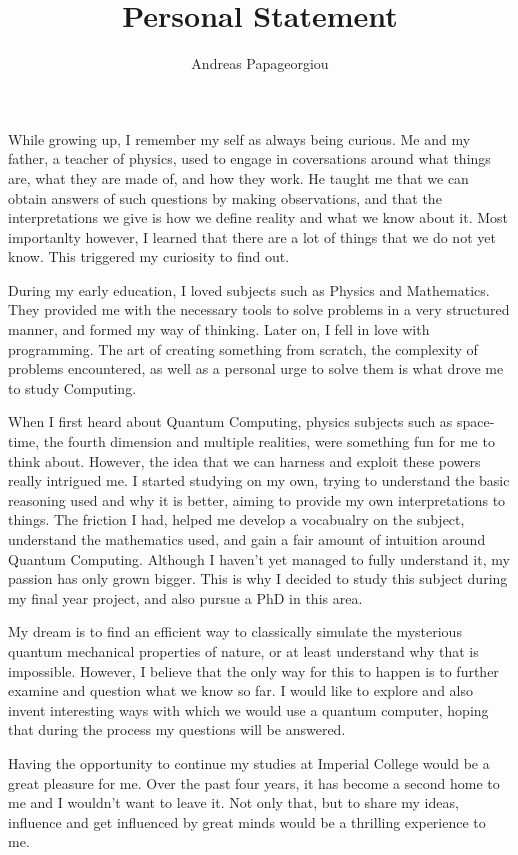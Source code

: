 \documentclass[a4paper,10pt]{article}
\title{Personal Statement}
\author{Andreas Papageorgiou}
\date{}
\begin{document}
\maketitle
\thispagestyle{empty}

\onehalfspacing

While growing up, I remember my self as always being curious. Me and my father, a teacher of physics, used to engage in coversations around
what things are, what they are made of, and how they work. He taught me that we can obtain answers of such
questions by making observations, and that the interpretations we give is how we define reality and what we know about it.
Most importanlty however, I learned that there are a lot of things that we do not yet know. This triggered my curiosity to find out.

During my early education, I loved subjects such as Physics and Mathematics. They provided me with the necessary tools
to solve problems in a very structured manner, and formed my way of thinking. Later on, I fell in love with programming.
The art of creating something from scratch, the complexity of problems encountered, as well as a personal urge to solve them
is what drove me to study Computing.

When I first heard about Quantum Computing, physics subjects such as space-time, the fourth dimension and multiple realities, were 
something fun for me to think about. However, the idea that we can harness and exploit these powers really intrigued me.
I started studying on my own, trying to understand the basic reasoning used and why it is better, aiming to provide my own
interpretations to things. The friction I had, helped me develop a vocabualry on the subject, understand the mathematics used,
and gain a fair amount of intuition around Quantum Computing. Although I haven't yet managed to fully understand it,
my passion has only grown bigger. This is why I decided to study this subject during my final year project, and also pursue a PhD in this area.

My dream is to find an efficient way to classically simulate the mysterious quantum mechanical properties of nature, or at least understand
why that is impossible. However, I believe that the only way for this to happen is to further examine and question what we know so far.
I would like to explore and also invent interesting ways with which we would use a quantum computer,
hoping that during the process my questions will be answered.

Having the opportunity to continue my studies  at Imperial College would be a great pleasure for me. Over the past four years, it has become
a second home to me and I wouldn't want to leave it. Not only that, but to share my ideas, influence and get influenced by great minds would be a thrilling
experience to me.
\end{document}
